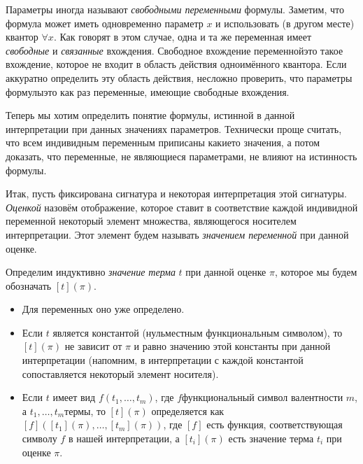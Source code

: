 Параметры иногда называют \emph{свободными переменными}%
%
формулы.
Заметим, что формула может иметь одновременно параметр $x$ и
использовать (в другом месте) квантор $\forall x$. Как говорят в
этом случае, одна и та же переменная имеет \emph{свободные}%
%
и
\emph{связанные}%
%
вхождения. Свободное вхождение переменной\т это
такое вхождение, которое не входит в область действия одноимённого
квантора. Если аккуратно определить эту область действия,
несложно проверить, что параметры формулы\т это как раз
переменные, имеющие свободные вхождения.

Теперь мы хотим определить понятие формулы, истинной в данной
интерпретации при данных значениях параметров. Технически проще
считать, что всем индивидным переменным приписаны какие\д то
значения, а потом доказать, что переменные, не являющиеся
параметрами, не влияют на истинность формулы.

Итак, пусть фиксирована сигнатура и некоторая интерпретация
этой сигнатуры. \emph{Оценкой}%
назовём отображение, которое
ставит в соответствие каждой индивидной
переменной некоторый элемент
множества, являющегося носителем интерпретации. Этот элемент
будем называть \emph{значением переменной}%
%
при данной оценке.

Определим индуктивно \emph{значение терма}%
%
$t$ при данной оценке
$\pi$, которое мы будем обозначать $[t](\pi)$.
        \begin{itemize}\item
Для переменных оно уже определено.
        \item
Если $t$ является константой (нульместным
функциональным символом), то $[t](\pi)$ не зависит от $\pi$ и
равно значению этой константы при данной интерпретации
(напомним, в интерпретации с каждой константой сопоставляется
некоторый элемент но\-си\-теля).
        \item
Если $t$ имеет вид $f(t_1,\dots,t_m)$, где $f$\т функциональный
символ валентности $m$, а $t_1,\dots,t_m$\т термы, то
$[t](\pi)$ определяется как $[f]([t_1](\pi),\dots,[t_m](\pi))$, где
$[f]$ есть функция, соответствующая символу $f$ в нашей
интерпретации, а $[t_i](\pi)$ есть значение терма $t_i$
при оценке $\pi$.
        \end{itemize}

